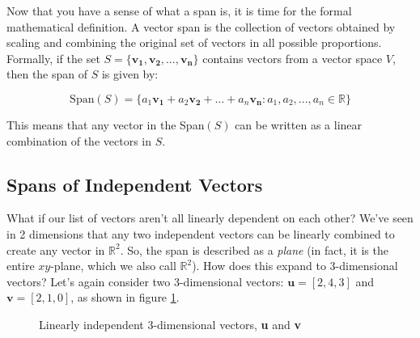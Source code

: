 Now that you have a sense of what a span is, it is time for the formal 
mathematical definition. A vector span is the collection of vectors obtained 
by scaling and combining the original set of vectors in all possible 
proportions. Formally, if the set $S = \{\mathbf{v_1}, \mathbf{v_2}, \dots, 
\mathbf{v_n}\}$ contains vectors from a vector space $V$, then the span of $S$ 
is given by:

\begin{equation}
\text{Span}(S) = \{a_1 \mathbf{v_1} + a_2 \mathbf{v_2} + \dots + a_n 
\mathbf{v_n} : a_1, a_2, ..., a_n \in \mathbb{R}\}
\end{equation}

This means that any vector in the Span$(S)$ can be written as a linear 
combination of the vectors in $S$.

\subsection{Spans of Independent Vectors}
What if our list of vectors aren't all linearly dependent on each other? We've 
seen in 2 dimensions that any two independent vectors can be linearly combined 
to create any vector in $\mathbb{R}^2$. So, the span is described as a 
\textit{plane} (in fact, it is the entire $xy$-plane, which we also call 
$\mathbb{R}^2$). How does this expand to 3-dimensional vectors? 
Let's again consider two 3-dimensional vectors: $\mathbf{u} = \left[2, 4, 3 
\right]$ and $\mathbf{v} = \left[ 2, 1, 0 \right]$, as shown in figure 
\ref{fig:3d_ind}.

\begin{figure}[htbp]
\centering
{}
\caption{Linearly independent 3-dimensional vectors, \textbf{u} and \textbf{v}}
\label{fig:3d_ind}
\end{figure}

